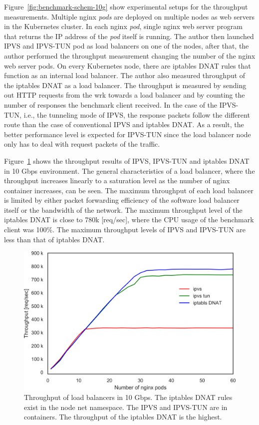 Figure~\ref{fig:benchmark-schem-10g} show experimental setups for the throughput measurements.
Multiple nginx {\em pods} are deployed on multiple nodes as web servers in the Kubernetes cluster.
In each nginx {\em pod}, single nginx web server program that returns the IP address of the {\em pod} itself is running.
The author then launched IPVS and IPVS-TUN pod as load balancers on one of the nodes, after that, the author performed the throughput measurement changing the number of the nginx web server pods.
On every Kubernetes node, there are iptables DNAT rules that function as an internal load balancer.
The author also measured throughput of the iptables DNAT as a load balancer.
The throughput is measured by sending out HTTP requests from the wrk towards a load balancer and by counting the number of responses the benchmark client received.
In the case of the IPVS-TUN, i.e., the tunneling mode of IPVS, the response packets follow the different route than the case of conventional IPVS and iptables DNAT.
As a result, the better performance level is expected for IPVS-TUN since the load balancer node only has to deal with request packets of the traffic.

\FloatBarrier

Figure~\ref{fig:ipvs_l3dsr_10g} shows the throughput results of IPVS, IPVS-TUN and iptables DNAT in 10 Gbps environment.
The general characteristics of a load balancer, where the throughput increases linearly to a saturation level as the number of nginx container increases, can be seen.
The maximum throughput of each load balancer is limited by either packet forwarding efficiency of the software load balancer itself or the bandwidth of the network.
The maximum throughput level of the iptables DNAT is close to 780k [req/sec], where the CPU usage of the benchmark client was 100\%.
The maximum throughput levels of IPVS and IPVS-TUN are less than that of iptables DNAT. 

\begin{figure}[h]
  \centering
  \includegraphics[width=0.8\columnwidth]{Figs/ipvs_l3dsr_10g}
  \par\bigskip
  \centering
  \begin{minipage}{0.9\columnwidth}
    \caption[Throughput of load balancers in 10 Gbps]{
      Throughput of load balancers in 10 Gbps.
      The iptables DNAT rules exist in the node net namespace.
      The IPVS and IPVS-TUN are in containers.
      The throughput of the iptables DNAT is the highest.
    }
    \label{fig:ipvs_l3dsr_10g}
  \end{minipage}
\end{figure}

